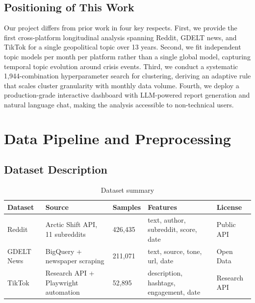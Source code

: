 \documentclass[12pt, letterpaper]{article}
\begin{document}
\subsection{Positioning of This Work}

Our project differs from prior work in four key respects. First, we provide the first cross-platform longitudinal analysis spanning Reddit, GDELT news, and TikTok for a single geopolitical topic over 13 years. Second, we fit independent topic models per month per platform rather than a single global model, capturing temporal topic evolution around crisis events. Third, we conduct a systematic 1,944-combination hyperparameter search for clustering, deriving an adaptive rule that scales cluster granularity with monthly data volume. Fourth, we deploy a production-grade interactive dashboard with LLM-powered report generation and natural language chat, making the analysis accessible to non-technical users.

\section{Data Pipeline and Preprocessing}
\label{sec:data}

\subsection{Dataset Description}
\begin{table}[H]
  \centering
  \caption{Dataset summary}
  \label{tab:dataset}
  \begin{tabularx}{\linewidth}{lXlll}
    \toprule
    \textbf{Dataset} & \textbf{Source} & \textbf{Samples} & \textbf{Features} & \textbf{License} \\
    \midrule
    Reddit       & Arctic Shift API, 11 subreddits         & 426,435  & text, author, subreddit, score, date & Public API \\
    GDELT News   & BigQuery + newspaper scraping            & 211,071  & text, source, tone, url, date        & Open Data  \\
    TikTok       & Research API + Playwright automation     & 52,895   & description, hashtags, engagement, date & Research API \\
    \bottomrule
  \end{tabularx}
\end{table}
\end{document}
